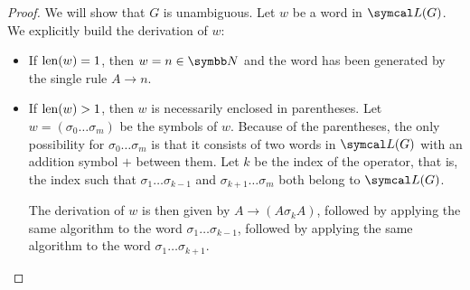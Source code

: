 \begin{proof}
  We will show that \( G \) is unambiguous. Let \( w \) be a word in \( \Cal{L}(G) \). We explicitly build the derivation of \( w \):
  \begin{itemize}
    \item If \( \operatorname{len}(w) = 1 \), then \( w = n \in \BN \) and the word has been generated by the single rule \( A \to n \).
    \item If \( \operatorname{len}(w) > 1 \), then \( w \) is necessarily enclosed in parentheses. Let \( w = ( \sigma_0 \ldots \sigma_m ) \) be the symbols of \( w \). Because of the parentheses, the only possibility for \( \sigma_0 \ldots \sigma_m \) is that it consists of two words in \( \Cal{L}(G) \) with an addition symbol \( + \) between them. Let \( k \) be the index of the operator, that is, the index such that \( \sigma_1 \ldots \sigma_{k-1} \) and \( \sigma_{k+1} \ldots \sigma_m \) both belong to \( \Cal{L}(G) \).

          The derivation of \( w \) is then given by \( A \to (A \sigma_k A) \), followed by applying the same algorithm to the word \( \sigma_1 \ldots \sigma_{k-1} \), followed by applying the same algorithm to the word \( \sigma_1 \ldots \sigma_{k+1} \).
  \end{itemize}
\end{proof}
